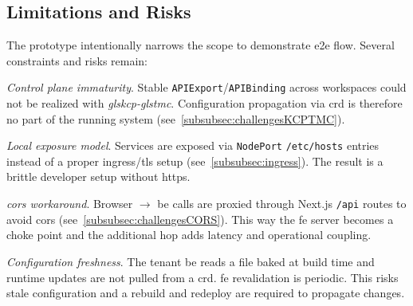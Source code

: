 \documentclass[11pt, a4paper, oneside, listof=totoc]{scrartcl}
\begin{document}
        \subsection{Limitations and Risks}\label{subsec:limitationsAndRisks}
            The prototype intentionally narrows the scope to demonstrate \gls{e2e} flow.
            Several constraints and risks remain:
            \begin{enumerate}[label={[\arabic*]:},
                    ref=Challenge~\arabic*,
                    leftmargin=*,
                    itemsep=0.6\baselineskip]

                    \item\label{chal:controlPlaneImmaturity}
                        \textit{Control plane immaturity}.
                        Stable \texttt{APIExport}/\texttt{APIBinding} across workspaces could not be
                        realized with \emph{gls{kcp}-gls{tmc}}.
                        Configuration propagation via \gls{crd} is therefore no part of the running
                        system (see~\autoref{subsubsec:challengesKCPTMC}).

                    \item\label{chal:localExposureModel}
                        \textit{Local exposure model}.
                        Services are exposed via \texttt{NodePort} \texttt{/etc/hosts} entries
                        instead of a proper ingress/\gls{tls} setup
                        (see~\autoref{subsubsec:ingress}).
                        The result is a brittle developer setup without \gls{https}.

                    \item\label{chal:corsWorkaround}
                        \textit{\gls{cors} workaround}.
                        Browser $\rightarrow$ \gls{be} calls are proxied through Next.js
                        \texttt{/api} routes to avoid \gls{cors}
                        (see~\autoref{subsubsec:challengesCORS}).
                        This way the \gls{fe} server becomes a choke point and the additional hop
                        adds latency and operational coupling.

                    \item\label{chal:configFreshness}
                        \textit{Configuration freshness}.
                        The tenant \gls{be} reads a file baked at build time and runtime updates are
                        not pulled from a \gls{crd}.
                        \gls{fe} revalidation is periodic.
                        This risks stale configuration and a rebuild and redeploy are required to
                        propagate changes.


\end{enumerate}
\end{document}
